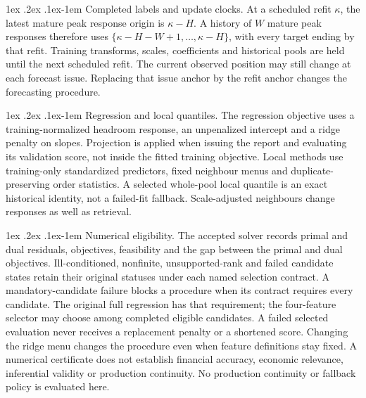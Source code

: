 \documentclass[10pt,a4paper]{article}
\makeatletter
\renewcommand\paragraph{\@startsection{paragraph}{4}{\z@}%
  {1ex \@plus .2ex \@minus .1ex}{-1em}%
  {\normalfont\normalsize\bfseries}}
\makeatother
\begin{document}
\paragraph{Completed labels and update clocks.}
At a scheduled refit \(\kappa\), the latest mature peak response origin is
\(\kappa-H\). A history of \(W\) mature peak responses therefore uses
\(\{\kappa-H-W+1,\ldots,\kappa-H\}\), with every target ending by that refit.
Training transforms, scales, coefficients and historical pools are held until
the next scheduled refit. The current observed position may still change at
each forecast issue. Replacing that issue anchor by the refit anchor changes
the forecasting procedure.

\paragraph{Regression and local quantiles.}
The regression objective uses a training-normalized headroom response, an
unpenalized intercept and a ridge penalty on slopes. Projection is applied when
issuing the report and evaluating its validation score, not inside the fitted
training objective. Local methods use training-only standardized predictors,
fixed neighbour menus and duplicate-preserving order statistics. A selected
whole-pool local quantile is an exact historical identity, not a failed-fit
fallback. Scale-adjusted neighbours change responses as well as retrieval.

\paragraph{Numerical eligibility.}
The accepted solver records primal and dual residuals, objectives, feasibility and the gap between the primal and dual objectives. Ill-conditioned, nonfinite, unsupported-rank and failed candidate
states retain their original statuses under each named selection contract.
A mandatory-candidate failure blocks a procedure when its contract requires
every candidate. The original full regression has that requirement; the
four-feature selector may choose among completed eligible candidates. A failed
selected evaluation never receives a replacement penalty or a shortened score.
Changing the ridge menu changes the procedure even when feature definitions
stay fixed. A numerical certificate does not establish financial accuracy,
economic relevance, inferential validity or production continuity.
No production continuity or fallback policy is evaluated here.
\end{document}
